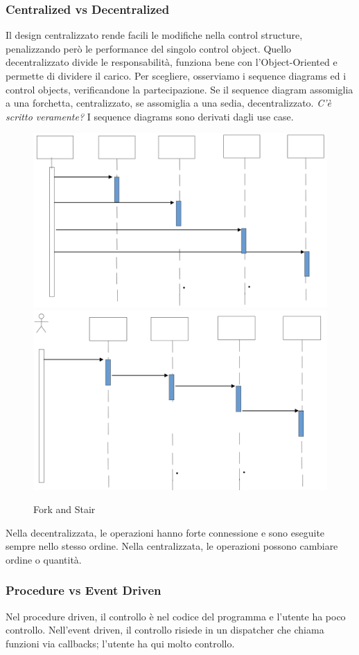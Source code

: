 \documentclass[11pt]{article}
\begin{document}
\subsubsection{Centralized vs Decentralized}
Il design centralizzato rende facili le modifiche nella control structure, penalizzando però le performance del singolo control object. Quello decentralizzato divide le responsabilità, funziona bene con l'Object-Oriented e permette di dividere il carico. Per scegliere, osserviamo i sequence diagrams ed i control objects, verificandone la partecipazione. Se il sequence diagram assomiglia a una forchetta, centralizzato, se assomiglia a una sedia, decentralizzato. \textit{C'è scritto veramente?}
I sequence diagrams sono derivati dagli use case.
\begin{figure}[H]
    \includegraphics[width=0.5\linewidth]{res/teoria/Fork.png}
    \includegraphics[width=0.5\linewidth]{res/teoria/Stair.png}
    \caption{Fork and Stair}
\end{figure}
Nella decentralizzata, le operazioni hanno forte connessione e sono eseguite sempre nello stesso ordine. Nella centralizzata, le operazioni possono cambiare ordine o quantità.
\subsubsection{Procedure vs Event Driven}
Nel procedure driven, il controllo è nel codice  del programma e l'utente ha poco controllo. Nell'event driven, il controllo risiede in un dispatcher che chiama funzioni via callbacks; l'utente ha qui molto controllo. 
\end{document}
